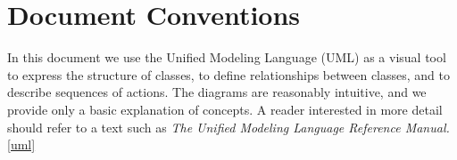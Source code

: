\section{Document Conventions}
\label{sec:conventions}

In this document we use the Unified Modeling Language (UML) as a visual tool 
to express the structure of 
classes, to define relationships between classes, and to describe sequences
of actions.  The diagrams are reasonably intuitive, and we provide 
only a basic explanation of concepts.  A reader interested in more detail should 
refer to a text such as {\it The Unified Modeling Language Reference Manual.}
 \ref{uml}





